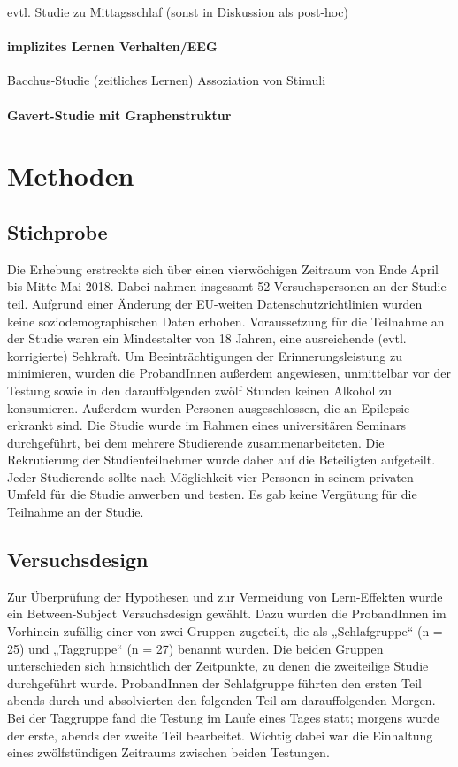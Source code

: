 evtl. Studie zu Mittagsschlaf (sonst in Diskussion als post-hoc)

\paragraph{implizites Lernen Verhalten/EEG}
Bacchus-Studie (zeitliches Lernen)
Assoziation von Stimuli

\paragraph{Gavert-Studie mit Graphenstruktur}

\section{Methoden}
\label{S:2}

\subsection{Stichprobe}
Die Erhebung erstreckte sich über einen vierwöchigen Zeitraum von Ende April bis Mitte Mai 2018. Dabei nahmen insgesamt 52 Versuchspersonen an der Studie teil. Aufgrund einer Änderung der  EU-weiten Datenschutzrichtlinien wurden keine soziodemographischen Daten erhoben. Voraussetzung für die Teilnahme an der Studie waren ein Mindestalter von 18 Jahren, eine ausreichende (evtl. korrigierte) Sehkraft. Um Beeinträchtigungen der Erinnerungsleistung zu minimieren, wurden die ProbandInnen außerdem angewiesen, unmittelbar vor der Testung sowie in den darauffolgenden zwölf Stunden keinen Alkohol zu konsumieren. Außerdem wurden Personen ausgeschlossen, die an Epilepsie erkrankt sind.
Die Studie wurde im Rahmen eines universitären Seminars durchgeführt, bei dem mehrere Studierende zusammenarbeiteten. Die Rekrutierung der Studienteilnehmer wurde daher auf die Beteiligten aufgeteilt. Jeder Studierende sollte nach Möglichkeit vier Personen in seinem privaten Umfeld für die Studie anwerben und testen. Es gab keine Vergütung für die Teilnahme an der Studie.

\subsection{Versuchsdesign}
Zur Überprüfung der Hypothesen und zur Vermeidung von Lern-Effekten wurde ein Between-Subject Versuchsdesign gewählt. Dazu wurden die ProbandInnen im Vorhinein zufällig einer von zwei Gruppen zugeteilt, die als „Schlafgruppe“ (n = 25) und „Taggruppe“ (n = 27) benannt wurden. Die beiden Gruppen unterschieden sich hinsichtlich der Zeitpunkte, zu denen die zweiteilige Studie durchgeführt wurde. ProbandInnen der Schlafgruppe führten den ersten Teil abends durch und absolvierten den folgenden Teil am darauffolgenden Morgen. Bei der Taggruppe fand die Testung im Laufe eines Tages statt; morgens wurde der erste, abends der zweite Teil bearbeitet. Wichtig dabei war die Einhaltung eines zwölfstündigen Zeitraums zwischen beiden Testungen.

